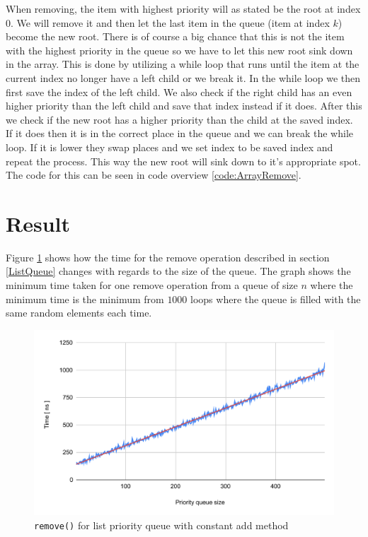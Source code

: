 \documentclass[a4paper,11pt]{article}
\begin{document}
When removing, the item with highest priority will as stated be the root at index 0. We will remove it and then let 
the last item in the queue (item at index $k$) become the new root. There is of course a big chance that this is 
not the item with the highest priority in the queue so we have to let this new root sink down in the array. This is 
done by utilizing a while loop that runs until the item at the current index no longer have a left child or we break it.
In the while loop we then first save the index of the left child. We also check
if the right child has an even higher priority than the left child and save that index instead if it does. After 
this we check if the new root has a higher priority than the child at the saved index. If it does then it is in 
the correct place in the queue and we can break the while loop. If it is lower they swap places and we set index 
to be saved index and repeat the process. This way the new root will sink down to it's appropriate spot. The code
for this can be seen in code overview \ref{code:ArrayRemove}.

\section{Result}
Figure \ref{fig:ListQueueRemove} shows how the time for the remove operation described in section \ref{ListQueue} changes
with regards to the size of the queue. The graph shows the minimum time taken for one remove operation from a queue
of size $n$ where the minimum time is the minimum from $1000$ loops where the queue is filled with the same random 
elements each time.
\begin{figure}[h!]
    \centering
        \includegraphics[width=\textwidth]{ListQueueRemove.pdf}
    \caption{{\tt remove()} for list priority queue with constant add method}
    \label{fig:ListQueueRemove}
\end{figure}
\end{document}
